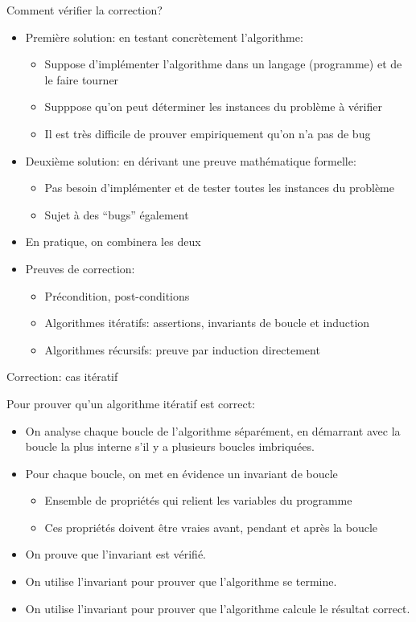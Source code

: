 \begin{frame}{Comment vérifier la correction?}
\begin{itemize}
\item Première solution: en testant concrètement l'algorithme:
\begin{itemize}
\item Suppose d'implémenter l'algorithme dans un langage (programme)
  et de le faire tourner
\item Supppose qu'on peut déterminer les instances du problème à vérifier
\item Il est très difficile de prouver empiriquement qu'on n'a pas de bug %
\end{itemize}
\item Deuxième solution: en dérivant une preuve mathématique formelle:
\begin{itemize}
\item Pas besoin d'implémenter et de tester toutes les instances du problème
\item Sujet à des ``bugs'' également
\end{itemize}
\item En pratique, on combinera les deux

\bigskip

\item Preuves de correction:
\begin{itemize}
\item Précondition, post-conditions
\item Algorithmes itératifs: assertions, invariants de boucle et induction
\item Algorithmes récursifs: preuve par induction directement
\end{itemize}
\end{itemize}
\end{frame}

\begin{frame}{Correction: cas itératif}

Pour prouver qu'un algorithme itératif est correct:
\begin{itemize}
\item On analyse chaque boucle de l'algorithme séparément, en
  démarrant avec la boucle la plus interne s'il y a plusieurs
  boucles imbriquées.
\item Pour chaque boucle, on met en évidence un invariant de boucle
\begin{itemize}
\item Ensemble de propriétés qui relient les variables du programme
\item Ces propriétés doivent être vraies avant, pendant et après la boucle
\end{itemize}
\item On prouve que l'invariant est vérifié.
\item On utilise l'invariant pour prouver que l'algorithme se termine.
\item On utilise l'invariant pour prouver que l'algorithme calcule le résultat correct.
\end{itemize}

\end{frame}

